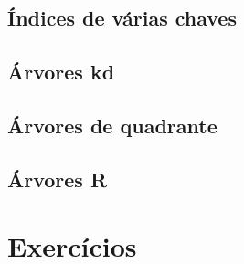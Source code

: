\subsection{Índices de várias chaves}

\subsection{Árvores kd}

\subsection{Árvores de quadrante}

\subsection{Árvores R}

\section{Exercícios}

